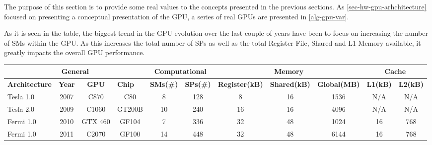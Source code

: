 The purpose of this section is to provide some real values to the concepts presented in the previous sections.
As \cref{sec-hw-gpu-arhchitecture} focused on presenting a conceptual presentation of the GPU, a series of real GPUs are presented in \cref{alg-gpu-var}.

As it is seen in the table, the biggest trend in the GPU evolution over the last couple of years have been to focus on increasing the number of SMs within the GPU.
As this increases the total number of SPs as well as the total Register File, Shared and L1 Memory available, it greatly impacts the overall GPU performance.

\begin{table}[]
	\begin{adjustbox}{width=1\textwidth}
	\centering
	\begin{tabular}{|l|c|c|c|c|c|c|c|c|c|c|}
	\hline
	\multicolumn{4}{|c|}{\textbf{General}}                                            & \multicolumn{2}{c|}{\textbf{Computational}} & \multicolumn{3}{c|}{\textbf{Memory}}                              & \multicolumn{2}{c|}{\textbf{Cache}} \\ \hline
	\textbf{Architecture} & \textbf{Year} & \textbf{GPU} & \multicolumn{1}{l|}{\textbf{Chip}} & \textbf{SMs(\#)}     & \textbf{SPs(\#)}     & \textbf{Register(kB)} & \textbf{Shared(kB)} & \textbf{Global(MB)} & \textbf{L1(kB)}  & \textbf{L2(kB)}  \\ \hline
	\cite{Li2016} Tesla 1.0     & 2007          & C870         & C80                                & 8                    & 128                  & 8                     & 16                  & 1536                & N/A              & N/A              \\ \hline
	\cite{Li2016} Tesla 2.0     & 2009          & C1060        & GT200B                             & 10                   & 240                  & 16                    & 16                  & 4096                & N/A              & N/A              \\ \hline
	\cite{Li2016} Fermi 1.0    & 2010          & GTX 460      & GF104                              & 7                    & 336                  & 32                    & 48                  & 1024                & 16               & 768              \\ \hline
	\cite{Li2016} Fermi 1.0      & 2011          & C2070        & GF100                              & 14                   & 448                  & 32                    & 48                  & 6144                & 16               & 768              \\ \hline

\end{tabular}
\end{adjustbox}
\end{table}
